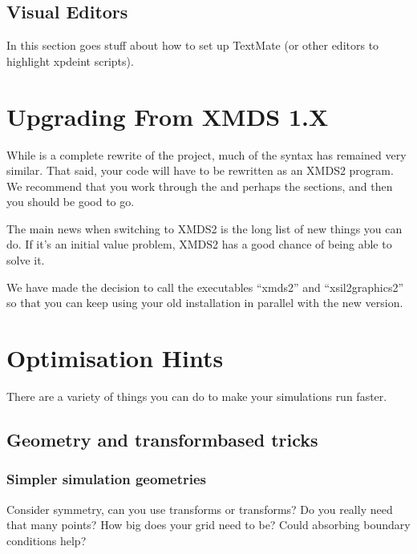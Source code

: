 \documentclass[letterpaper,10pt,english]{sphinxmanual}
\begin{document}
\section{Visual Editors}
\label{\detokenize{faq:visual-editors}}
\sphinxAtStartPar
In this section goes stuff about how to set up TextMate (or other editors to highlight xpdeint scripts).


\chapter{Upgrading From XMDS 1.X}
\label{\detokenize{upgrade:upgrading-from-xmds-1-x}}\label{\detokenize{upgrade:upgradefromxmds1}}\label{\detokenize{upgrade::doc}}
\sphinxAtStartPar
While  is a complete rewrite of the  project, much of the syntax has remained very similar.  That said, your code will have to be rewritten as an XMDS2 program.  We recommend that you work through the {\hyperref[\detokenize{tutorial:quickstarttutorial}]{}} and perhaps the {\hyperref[\detokenize{worked_examples:workedexamples}]{}} sections, and then you should be good to go.

\sphinxAtStartPar
The main news when switching to XMDS2 is the long list of new things you can do.  If it’s an initial value problem, XMDS2 has a good chance of being able to solve it.

\sphinxAtStartPar
We have made the decision to call the executables “xmds2” and “xsil2graphics2” so that you can keep using your old installation in parallel with the new version.


\chapter{Optimisation Hints}
\label{\detokenize{optimisation_hints:optimisation-hints}}\label{\detokenize{optimisation_hints:optimisationhints}}\label{\detokenize{optimisation_hints::doc}}
\sphinxAtStartPar
There are a variety of things you can do to make your simulations run faster.


\section{Geometry and transform\sphinxhyphen{}based tricks}
\label{\detokenize{optimisation_hints:geometry-and-transform-based-tricks}}

\subsection{Simpler simulation geometries}
\label{\detokenize{optimisation_hints:simpler-simulation-geometries}}
\sphinxAtStartPar
Consider symmetry, can you use  transforms or  transforms? Do you really need that many points? How big does your grid need to be? Could absorbing boundary conditions help?
\end{document}
